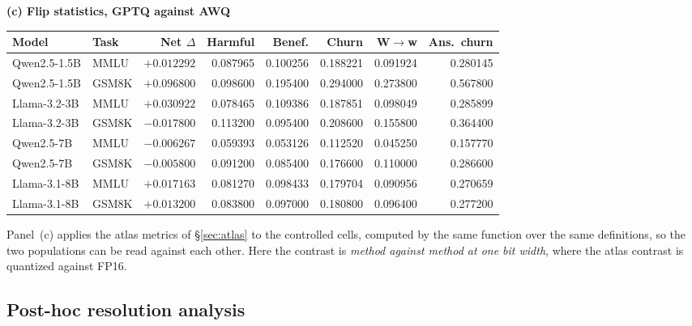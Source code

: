 \begin{table}[!tp]
\smallskip
\textbf{(c) Flip statistics, GPTQ against AWQ}\par\smallskip
\setlength{\tabcolsep}{2.5pt}
\footnotesize
\begin{tabular}{llrrrrrr}
\toprule
Model & Task & Net $\Delta$ & Harmful & Benef. & Churn & W$\to$w & Ans.\ churn \\
\midrule
Qwen2.5-1.5B & MMLU  & $+0.012292$ & 0.087965 & 0.100256 & 0.188221 & 0.091924 & 0.280145 \\
Qwen2.5-1.5B & GSM8K & $+0.096800$ & 0.098600 & 0.195400 & 0.294000 & 0.273800 & 0.567800 \\
Llama-3.2-3B & MMLU  & $+0.030922$ & 0.078465 & 0.109386 & 0.187851 & 0.098049 & 0.285899 \\
Llama-3.2-3B & GSM8K & $-0.017800$ & 0.113200 & 0.095400 & 0.208600 & 0.155800 & 0.364400 \\
Qwen2.5-7B   & MMLU  & $-0.006267$ & 0.059393 & 0.053126 & 0.112520 & 0.045250 & 0.157770 \\
Qwen2.5-7B   & GSM8K & $-0.005800$ & 0.091200 & 0.085400 & 0.176600 & 0.110000 & 0.286600 \\
Llama-3.1-8B & MMLU  & $+0.017163$ & 0.081270 & 0.098433 & 0.179704 & 0.090956 & 0.270659 \\
Llama-3.1-8B & GSM8K & $+0.013200$ & 0.083800 & 0.097000 & 0.180800 & 0.096400 & 0.277200 \\
\bottomrule
\end{tabular}
\end{table}

Panel~(c) applies the atlas metrics of \S\ref{sec:atlas} to the controlled
cells, computed by the same function over the same definitions, so the two
populations can be read against each other. Here the contrast is \emph{method
against method at one bit width}, where the atlas contrast is quantized against
FP16.

\subsection{Post-hoc resolution analysis}
\label{app:minigrid:resolution}

